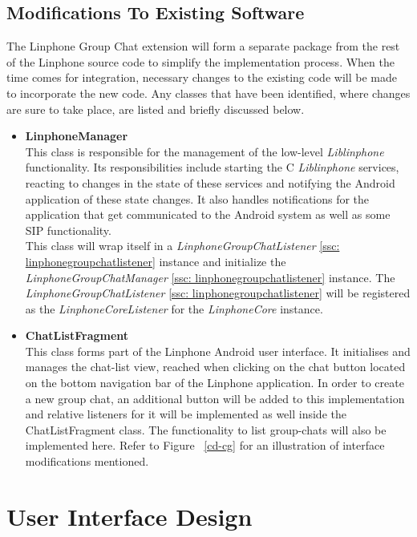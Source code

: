 \documentclass[11pt]{article}
\begin{document}
\subsection{Modifications To Existing Software}
The Linphone Group Chat extension will form a separate package from the rest of the Linphone source code to simplify the implementation process. When the time comes for integration, necessary changes to the existing code will be made to incorporate the new code. Any classes that have been identified, where changes are sure to take place, are listed and briefly discussed below.
\begin{itemize}
\item \textbf{LinphoneManager}\\
This class is responsible for the management of the low-level \textit{Liblinphone} functionality. Its responsibilities include starting the C \textit{Liblinphone} services, reacting to changes in the state of these services and notifying the Android application of these state changes. It also handles notifications for the application that get communicated to the Android system as well as some SIP functionality.\\
This class will wrap itself in a \textit{LinphoneGroupChatListener} \ref{ssc: linphonegroupchatlistener} instance and initialize the \textit{LinphoneGroupChatManager} \ref{ssc: linphonegroupchatlistener} instance. The \textit{LinphoneGroupChatListener} \ref{ssc: linphonegroupchatlistener} will be registered as the \textit{LinphoneCoreListener} for the \textit{LinphoneCore} instance.
\item \textbf{ChatListFragment}\\
This class forms part of the Linphone Android user interface. It initialises and manages the chat-list view, reached when clicking on the chat button located on the bottom navigation bar of the Linphone application. In order to create a new group chat, an additional button will be added to this implementation and relative listeners for it will be implemented as well inside the ChatListFragment class. The functionality to list group-chats will also be implemented here. Refer to Figure ~\ref{cd-cg} for an illustration of interface modifications mentioned.

\end{itemize}

\section{User Interface Design}
\end{document}
